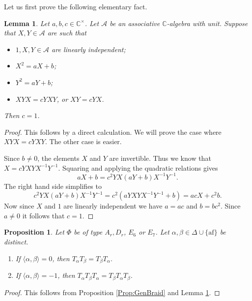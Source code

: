 \documentclass[10pt, letterpaper]{amsart}
\theoremstyle{plain}
\newtheorem{Prop}[equation]{Proposition}
\newtheorem{Lem}[equation]{Lemma}
\theoremstyle{definition}
\numberwithin{equation}{section}
\newcommand{\af}{\mathrm{af}}
\begin{document}
    Let us first prove the following elementary fact.	
	\begin{Lem}\label{BraidLem}
		Let $a,b,c\in \mathbb{C}^{\times}$. Let $\mathcal{A}$ be an associative $\mathbb{C}$-algebra with unit. Suppose that $X,Y\in \mathcal{A}$ are such that
		\begin{itemize}
			\item $1,X,Y\in \mathcal{A}$ are linearly independent;
			\item $X^{2}=aX+b$;
			\item $Y^{2}=aY+b$;
			\item $XYX=cYXY$, or $XY=cYX$.
		\end{itemize}
		Then $c=1$.
	\end{Lem}
	
	\begin{proof}
		This follows by a direct calculation. We will prove the case where $XYX=cYXY$. The other case is easier.
		
		Since $b\neq 0$, the elements $X$ and $Y$ are invertible. Thus we know that $X=cYXYX^{-1}Y^{-1}$. Squaring and applying the quadratic relations gives
		\begin{equation*}
			aX+b = c^{2}YX(aY+b)X^{-1}Y^{-1}.
		\end{equation*}
		The right hand side simplifies to 
		\begin{equation*}
			c^{2}YX(aY+b)X^{-1}Y^{-1}=c^{2}(aYXYX^{-1}Y^{-1}+b)=acX+c^{2}b.
		\end{equation*}
		Now since $X$ and $1$ are linearly independent we have $a=ac$ and $b=bc^{2}$. Since $a\neq 0$ it follows that $c=1$.
 	\end{proof}
	
	\begin{Prop}\label{CompleteBraidRel}
		Let $\Phi$ be of type $A_r,D_r$, $E_{6}$ or $E_{7}$. Let $\alpha,\beta\in \Delta\cup\{\af\}$ be distinct.
		\begin{enumerate}
			\item If $\langle\alpha,\beta\rangle=0$, then $T_{\alpha}T_{\beta}=T_{\beta}T_{\alpha}$.
			\item If $\langle\alpha,\beta\rangle=-1$, then $T_{\alpha}T_{\beta}T_{\alpha}=T_{\beta}T_{\alpha}T_{\beta}$.
		\end{enumerate}
	\end{Prop}
	
	\begin{proof}
		This follows from Proposition \ref{Prop:GenBraid} and Lemma \ref{BraidLem}.
	\end{proof}
	
\end{document}
